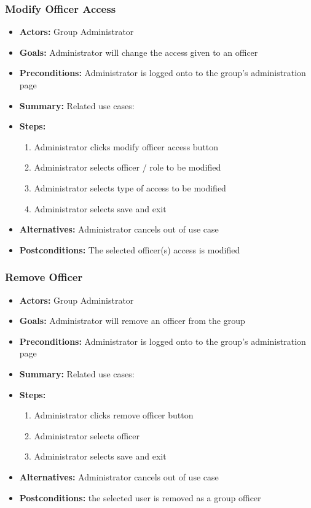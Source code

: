 			\subsubsection{Modify Officer Access}
			\begin{itemize}
				\item{\textbf{Actors:} Group Administrator}
				\item{\textbf{Goals:} Administrator will change the access given to an officer}
				\item{\textbf{Preconditions:} Administrator is logged onto to the group's administration page}
				\item{\textbf{Summary:} Related use cases:}
				\item{\textbf{Steps:}
				\begin{enumerate}
					\item{Administrator clicks modify officer access
						button}
					\item{Administrator selects officer / role to be
						modified}
					\item{Administrator selects type of access to be
						modified}
					\item{Administrator selects save and exit}
				\end{enumerate}
				}
				\item{\textbf{Alternatives:} Administrator cancels out of
					use case}
				\item{\textbf{Postconditions:} The selected officer(s)
					access is modified}
			\end{itemize}

			\subsubsection{Remove Officer}
			\begin{itemize}
				\item{\textbf{Actors:} Group Administrator}
				\item{\textbf{Goals:} Administrator will remove an officer
					from the group}
				\item{\textbf{Preconditions:} Administrator is logged onto
					to the group's administration page}
				\item{\textbf{Summary:} Related use cases:}
				\item{\textbf{Steps:}
				\begin{enumerate}
					\item{Administrator clicks remove officer button}
					\item{Administrator selects officer}
					\item{Administrator selects save and exit}
				\end{enumerate}
				}
				\item{\textbf{Alternatives:} Administrator cancels out of
					use case}
				\item{\textbf{Postconditions:} the selected user is
					removed as a group officer}
			\end{itemize}
